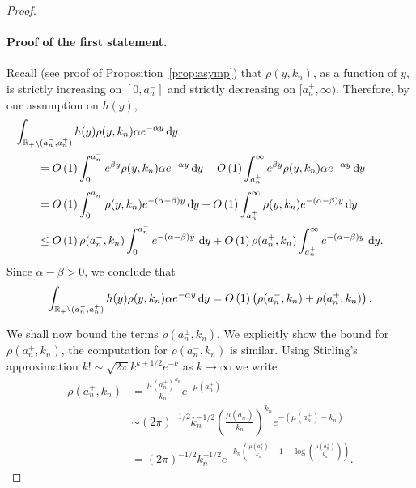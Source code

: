 \begin{proof}\hfill

\paragraph{Proof of the first statement.}
Recall (see proof of Proposition~\ref{prop:asymp}) that $\rho(y,k_n)$, as a function of $y$, is strictly increasing on $[0,a_n^-]$ and strictly decreasing on $[a_n^+,\infty)$. Therefore, by our assumption on $h(y)$,
\begin{align*}
	&\hspace{-20pt}\int_{\R_+ \setminus (a_n^-, a_n^+)} h(y) \rho(y,k_n) 
		\alpha e^{-\alpha y} \dd y\\
    &= \bigO{1} \int_0^{a_n^-} e^{\beta y} \rho(y,k_n) \alpha e^{-\alpha y} \dd y 
    	+ \bigO{1}\int_{a_n^+}^{\infty} e^{\beta y} \rho(y,k_n) \alpha e^{-\alpha y} \dd y \\
    &= \bigO{1} \int_0^{a_n^-} \rho(y,k_n) e^{-(\alpha-\beta) y} \dd y 
   		+ \bigO{1} \int_{a_n^+}^{\infty} \rho(y,k_n) e^{-(\alpha-\beta) y} \dd y\\
   	&\le \bigO{1}\rho(a_n^-,k_n)\int_0^{a_n^-} e^{-(\alpha-\beta) y} \, \dd y
   		+ \bigO{1} \rho(a_n^+,k_n) \int_{a_n^+}^{\infty} e^{-(\alpha-\beta) y} \, \dd y.
\end{align*}
Since $\alpha - \beta > 0$, we conclude that
\begin{equation}\label{eq:concentration_lemma_integral_bound}
	\int_{{\mathbb R}_+ \setminus (a_n^-, a_n^+)} h(y) \rho(y,k_n) \alpha e^{-\alpha y} \operatorname{\mathrm{d}\hspace{-2pt}} y
	= O\left(1\right) \left(\rho(a_n^-,k_n) + \rho(a_n^+,k_n)\right).
\end{equation}

We shall now bound the terms $\rho(a_n^\pm,k_n)$. We explicitly show the bound for $\rho(a_n^+,k_n)$, the computation for $\rho(a_n^-,k_n)$ is similar. Using Stirling's approximation $k! \sim \sqrt{2\pi} k^{k + 1/2} e^{-k}$ as $k \to \infty$ we write
\begin{align*}
	\rho(a_n^+,k_n) &= \frac{\mu(a_n^+)^{k_n}}{k_n!} e^{-\mu(a_n^+)} \\
	&\sim (2\pi)^{-1/2} k_n^{-1/2} \left(\frac{\mu(a_n^+)}{k_n}\right)^{k_n} e^{-(\mu(a_n^+) - k_n)}\\
	&= (2\pi)^{-1/2} k_n^{-1/2} 
		e^{-k_n\left(\frac{\mu(a_n^+)}{k_n} - 1 - \log\left(\frac{\mu(a_n^+)}{k_n}\right)\right)}.
\end{align*}


\end{proof}
